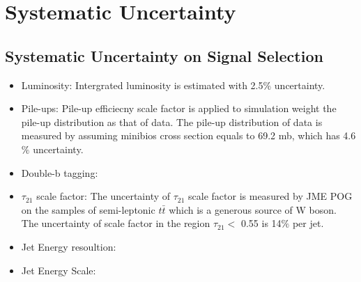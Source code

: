 
\chapter{Systematic Uncertainty} \label{Sysyematic Uncertainty}

\section{Systematic Uncertainty on Signal Selection} \label{Event reconstruction and selection}

\begin{itemize}
  \item Luminosity: Intergrated luminosity is estimated with 2.5$\% $ uncertainty. 
  \item Pile-ups: Pile-up efficiecny scale factor is applied to simulation weight the pile-up distribution as that of data. The pile-up distribution of data is measured by assuming minibios cross section equals to 69.2 mb, which has 4.6$\% $ uncertainty.  
  \item Double-b tagging:
  \item $\tau _{21}$ scale factor: The uncertainty of $\tau _{21}$ scale factor is measured by JME POG on the samples of semi-leptonic $t\bar{t}$ which is a generous source of W boson. The uncertainty of scale factor in the region $\tau _{21} <$ 0.55 is 14$\% $ per jet.
  \item Jet Energy resoultion:
  \item Jet Energy Scale:
\end{itemize}